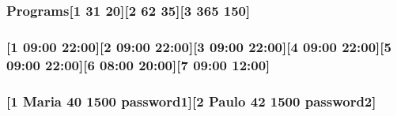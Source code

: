 \subsubsection[{\texorpdfstring{Programs}{Programs}}]{\setlength{\rightskip}{0pt plus 5cm}Programs\mbox{[}1 31 20\mbox{]}\mbox{[}2 62 35\mbox{]}\mbox{[}3 365 150\mbox{]}}\hypertarget{File_8txt_a079e4f76d2da3f02f43dfd6e67359bf7}{}\label{File_8txt_a079e4f76d2da3f02f43dfd6e67359bf7}
\subsubsection[{\texorpdfstring{Schedule}{Schedule}}]{\mbox{[}1 09\+:00 22\+:00\mbox{]}\mbox{[}2 09\+:00 22\+:00\mbox{]}\mbox{[}3 09\+:00 22\+:00\mbox{]}\mbox{[}4 09\+:00 22\+:00\mbox{]}\mbox{[}5 09\+:00 22\+:00\mbox{]}\mbox{[}6 08\+:00 20\+:00\mbox{]}\mbox{[}7 09\+:00 12\+:00\mbox{]}}\hypertarget{File_8txt_a061a3989efe937642aa9d1dc75313167}{}\label{File_8txt_a061a3989efe937642aa9d1dc75313167}
\subsubsection[{\texorpdfstring{Staff}{Staff}}]{\mbox{[}1 Maria 40 1500 password1\mbox{]}\mbox{[}2 Paulo 42 1500 password2\mbox{]}}\hypertarget{File_8txt_ace2bec253417dd04567d51f2f7a892f0}{}\label{File_8txt_ace2bec253417dd04567d51f2f7a892f0}

